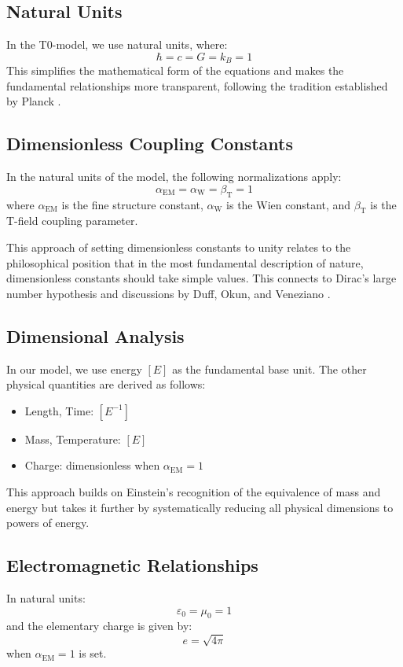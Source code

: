 \documentclass[a4paper,12pt]{article}
\newcommand{\betaT}{\beta_{\text{T}}}
\newcommand{\alphaEM}{\alpha_{\text{EM}}}
\newcommand{\alphaW}{\alpha_{\text{W}}}
\begin{document}
	\subsection{Natural Units}
	In the T0-model, we use natural units, where:
	\[
	\hbar = c = G = k_B = 1
	\]
	This simplifies the mathematical form of the equations and makes the fundamental relationships more transparent, following the tradition established by Planck \cite{Planck1899}.
	
	\subsection{Dimensionless Coupling Constants}
	In the natural units of the model, the following normalizations apply:
	\[
	\alphaEM = \alphaW = \betaT = 1
	\]
	where $\alphaEM$ is the fine structure constant, $\alphaW$ is the Wien constant, and $\betaT$ is the T-field coupling parameter.
	
	This approach of setting dimensionless constants to unity relates to the philosophical position that in the most fundamental description of nature, dimensionless constants should take simple values. This connects to Dirac's large number hypothesis \cite{Dirac1937} and discussions by Duff, Okun, and Veneziano \cite{Duff2002}.
	
	\subsection{Dimensional Analysis}
	In our model, we use energy $[E]$ as the fundamental base unit. The other physical quantities are derived as follows:
	\begin{itemize}[leftmargin=*,nosep]
		\item Length, Time: $[E^{-1}]$
		\item Mass, Temperature: $[E]$
		\item Charge: dimensionless when $\alphaEM = 1$
	\end{itemize}
	
	This approach builds on Einstein's recognition of the equivalence of mass and energy \cite{Einstein1905b} but takes it further by systematically reducing all physical dimensions to powers of energy.
	
	\subsection{Electromagnetic Relationships}
	In natural units:
	\[
	\varepsilon_0 = \mu_0 = 1
	\]
	and the elementary charge is given by:
	\[
	e = \sqrt{4\pi}
	\]
	when $\alphaEM = 1$ is set.
	
\end{document}
